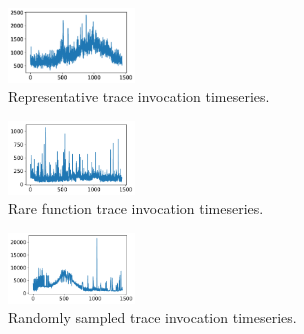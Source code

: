 \begin{figure}
 \centering   \includegraphics[width=0.3\textwidth]{../graphs/rep-funcs-392/392-b-trace.pdf}
  \caption{Representative trace invocation timeseries.}
  \label{fig:392-trace}
\end{figure}

\begin{figure}
  \centering  \includegraphics[width=0.3\textwidth]{../graphs/rare-funcs-1000/1000-b.pdf}
  \caption{Rare function trace invocation timeseries.}
  \label{fig:1000-trace}
\end{figure}


\begin{figure}
  \centering  \includegraphics[width=0.3\textwidth]{../graphs/random-funcs-200/200-c.pdf}
  \caption{Randomly sampled trace invocation timeseries.}
  \label{fig:200-trace}
\end{figure}


